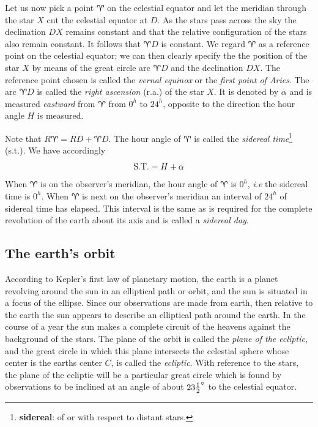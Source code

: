 Let us now pick a point $\aries$ on the celestial equator and let the
meridian through the star $X$ cut the celestial equator at $D$. As the
stars pass across the sky the declination $DX$ remains constant and
that the relative configuration of the stars also remain constant. It
follows that $\aries D$ is constant. We regard $\aries$ as a reference
point on the celestial equator; we can then clearly specify the the
position of the star $X$ by means of the great circle arc $\aries D$
and the declination $DX$. The reference point chosen is called the
{\it vernal equinox} or the {\it first point of Aries}. The arc
$\aries D$ is called the {\it right ascension} ({\sc r.a.}) of the
star $X$. It is denoted by $\alpha$ and is measured {\it eastward}
from $\aries$ from $0^h$ to $24^h$, opposite to the direction the hour
angle $H$ is measured. 

Note that $R\aries =RD+\aries D$. The hour angle of $\aries$ is called
the {\it sidereal time}\footnote{{\bf sidereal}: of or with respect to distant stars.} 
 ({\sc s.t.}). We have accordingly 
\[
{\rm S.T.}=H+\alpha
\]
When $\aries$ is on the observer's meridian, the hour angle of
$\aries$ is $0^h$, {\it i.e} the sidereal time is $0^h$. When $\aries$
is next on the observer's meridian an interval of $24^h$ of sidereal
time has elapsed. This interval is the same as is required for the
complete revolution of the earth about its axis and is called a {\it
  sidereal day}. 

\subsection{The earth's orbit}

According to Kepler's first law of planetary motion, the earth is a 
planet revolving around the sun in an elliptical path or orbit, and
the sun is situated in a focus of the ellipse. Since our observations
are made from earth, then relative to the earth the sun appears to
describe an elliptical path around the earth. In the course of a year
the sun makes a complete circuit of the heavens against the background
of the stars. The plane of the orbit is called the {\it plane of the
  ecliptic},  and the great circle in which this plane intersects the
celestial sphere whose center is the earths center $C$, is called the 
{\it ecliptic}. With reference to the stars, the plane of the ecliptic
will be a particular great circle which is found by observations to be
inclined at an angle of about $23{1\over 2}^\circ$ to the celestial
equator. 

